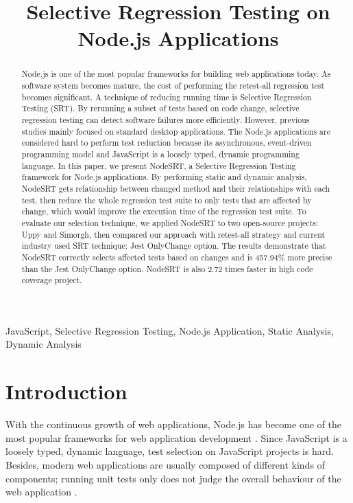 \documentclass[10pt, conference]{IEEEtran}
\begin{document}
\title{Selective Regression Testing on Node.js Applications}

\author{
}

\maketitle

\begin{abstract}
Node.js is one of the most popular frameworks for building web applications today. As software system 
becomes mature, the cost of performing the retest-all regression test becomes significant. A technique 
of reducing running time is Selective Regression Testing (SRT). By rerunning a subset of tests based on 
code change, selective regression testing can detect software failures more efficiently. However, 
previous studies mainly focused on standard desktop applications. The Node.js applications are 
considered hard to perform test reduction because its asynchronous, event-driven programming model and 
JavaScript is a loosely typed, dynamic programming language. 
In this paper, we present NodeSRT, a Selective Regression Testing framework for Node.js applications. 
By performing static and dynamic analysis, NodeSRT gets relationship between changed method and their 
relationships with each test, then reduce the whole regression test suite to only tests that are 
affected by change, which would improve the execution time of the regression test suite. 
To evaluate our selection technique, we applied NodeSRT to two open-source projects: Uppy and Simorgh, 
then compared our approach with retest-all strategy and current industry used SRT technique: Jest 
OnlyChange option. The results demonstrate that NodeSRT correctly selects affected tests based on 
changes and is 457.94\% more precise than the Jest OnlyChange option. NodeSRT is also 2.72 times faster in 
high code coverage project.
    
\end{abstract}

\begin{IEEEkeywords}
JavaScript, Selective Regression Testing, Node.js Application, Static Analysis, Dynamic Analysis
\end{IEEEkeywords}

\section{Introduction}
With the continuous growth of web applications, Node.js has become one of the most popular frameworks 
for web application development \cite{b16}. Since JavaScript is a loosely typed, dynamic language, test 
selection on JavaScript projects is hard. Besides, modern web applications are usually composed of 
different kinds of components; running unit tests only does not judge the overall behaviour of the web 
application \cite{b8}. 
\end{document}

